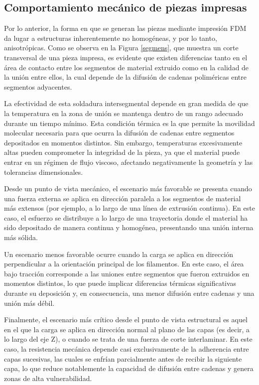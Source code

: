 \subsection{Comportamiento mecánico de piezas impresas}

Por lo anterior, la forma en que se generan las piezas mediante impresión FDM da lugar a estructuras inherentemente no homogéneas, y por lo tanto, anisotrópicas. Como se observa en la Figura \ref{segmens}, que muestra un corte transversal de una pieza impresa, es evidente que existen diferencias tanto en el área de contacto entre los segmentos de material extruido como en la calidad de la unión entre ellos, la cual depende de la difusión de cadenas poliméricas entre segmentos adyacentes.

La efectividad de esta soldadura intersegmental depende en gran medida de que la temperatura en la zona de unión se mantenga dentro de un rango adecuado durante un tiempo mínimo. Esta condición térmica es la que permite la movilidad molecular necesaria para que ocurra la difusión de cadenas entre segmentos depositados en momentos distintos. Sin embargo, temperaturas excesivamente altas pueden comprometer la integridad de la pieza, ya que el material puede entrar en un régimen de flujo viscoso, afectando negativamente la geometría y las tolerancias dimensionales.

Desde un punto de vista mecánico, el escenario más favorable se presenta cuando una fuerza externa se aplica en dirección paralela a los segmentos de material más extensos (por ejemplo, a lo largo de una línea de extrusión continua). En este caso, el esfuerzo se distribuye a lo largo de una trayectoria donde el material ha sido depositado de manera continua y homogénea, presentando una unión interna más sólida.

Un escenario menos favorable ocurre cuando la carga se aplica en dirección perpendicular a la orientación principal de los filamentos. En este caso, el área bajo tracción corresponde a las uniones entre segmentos que fueron extruidos en momentos distintos, lo que puede implicar diferencias térmicas significativas durante su deposición y, en consecuencia, una menor difusión entre cadenas y una unión más débil.

Finalmente, el escenario más crítico desde el punto de vista estructural es aquel en el que la carga se aplica en dirección normal al plano de las capas (es decir, a lo largo del eje Z), o cuando se trata de una fuerza de corte interlaminar. En este caso, la resistencia mecánica depende casi exclusivamente de la adherencia entre capas sucesivas, las cuales se enfrían parcialmente antes de recibir la siguiente capa, lo que reduce notablemente la capacidad de difusión entre cadenas y genera zonas de alta vulnerabilidad.

